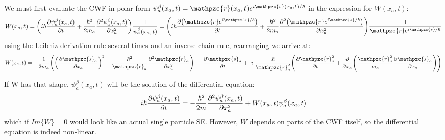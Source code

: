 \documentclass[11pt, a4paper]{article} %
\newcommand{\z}{\mathpzc{s}}
\newcommand{\p}{\mathpzc{r}}
\begin{document}
We must first evaluate the CWF in polar form $\psi^\beta_a(x_a,t)=\p(x_a,t) e^{i\z(x_a,t) / \hbar}$ in the expression for $W(x_a,t)$:
$$
W(x_a, t) = \qty(i \hbar \pdv{\psi_a^\beta(x_a,t)}{t} +\frac{\hbar^2}{2 m_a}\pdv[2]{\psi_a^\beta(x_a,t)}{x_a} ) \frac{1}{\psi_a^\beta(x_a,t)} = \qty(i \hbar \pdv{\qty(\p e^{i\z/\hbar})}{t} +\frac{\hbar^2}{2 m_a}\pdv[2]{\qty(\p e^{i\z/\hbar})}{x_a} ) \frac{1}{\p e^{i\z/\hbar}}
$$
using the Leibniz derivation rule several times and an inverse chain rule, rearranging we arrive at:
$$
W(x_a, t)=-\frac{1}{2m_a} \qty( \qty(\pdv{\z_a}{x_a})^2 -\frac{\hbar^2}{\p_a}\pdv[2]{\p_a}{x_a})\ -\pdv{\z_a}{t}+ \ i \ \frac{\hbar}{\p_a^2} \qty(\pdv{\p_a^2}{t}+\pdv{}{x_a}\qty(\frac{\p_a^2}{m_a}\pdv{\z_a}{x_a}))
$$

If W has that shape, $\psi_a^\beta(x_a,t)$ will be the solution of the differential equation:\vspace{-0.2cm}
$$
i \hbar \pdv{\psi_a^\beta(x_a,t)}{t} = -\frac{\hbar^2}{2 m}\pdv[2]{\psi_a^\beta(x_a,t)}{x_a} + W(x_a,t) \psi_a^\beta(x_a,t)\vspace{-0.2cm}
$$
which if $Im\{W\} =0$ would look like an actual single particle SE. However, $W$ depends on parts of the CWF itself, so the differential equation is indeed non-linear.\\
\end{document}
